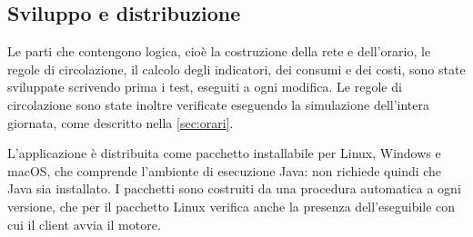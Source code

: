 \subsection{Sviluppo e distribuzione}
Le parti che contengono logica, cioè la costruzione della rete e dell'orario, le regole di circolazione, il calcolo degli indicatori, dei consumi e dei costi, sono state sviluppate scrivendo prima i test, eseguiti a ogni modifica. Le regole di circolazione sono state inoltre verificate eseguendo la simulazione dell'intera giornata, come descritto nella \cref{sec:orari}.

L'applicazione è distribuita come pacchetto installabile per Linux, Windows e macOS, che comprende l'ambiente di esecuzione Java: non richiede quindi che Java sia installato. I pacchetti sono costruiti da una procedura automatica a ogni versione, che per il pacchetto Linux verifica anche la presenza dell'eseguibile con cui il client avvia il motore.
